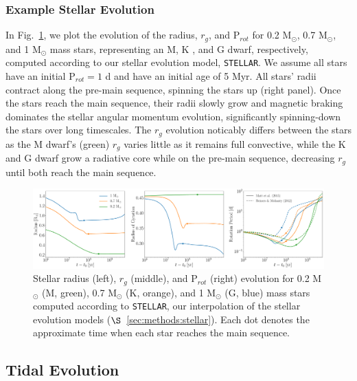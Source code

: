 \documentclass[twocolumn]{aastex61}
\newcommand{\stellar}[0]{\texttt{STELLAR}\xspace}
\begin{document}
\subsubsection{Example Stellar Evolution} \label{sec:methods:stellarExample}

In Fig.~\ref{fig:stellarExample}, we plot the evolution of the radius, $r_g$, and P$_{rot}$ for 0.2 M$_{\odot}$, 0.7 M$_{\odot}$, and 1 M$_{\odot}$ mass stars, representing an M, K , and G dwarf, respectively, computed according to our stellar evolution model, \stellar. We assume all stars have an initial P$_{rot} = 1$ d and have an initial age of 5 Myr. All stars' radii contract along the pre-main sequence, spinning the stars up (right panel). Once the stars reach the main sequence, their radii slowly grow and magnetic braking dominates the stellar angular momentum evolution, significantly spinning-down the stars over long timescales. The $r_g$ evolution noticably differs between the stars as the M dwarf's (green) $r_g$ varies little as it remains full convective, while the K and G dwarf grow a radiative core while on the pre-main sequence, decreasing $r_g$ until both reach the main sequence.

\begin{figure}[ht]
	\includegraphics[width=\textwidth]{../Plots/stellarExample.pdf}
   \caption{Stellar radius (left), $r_g$ (middle), and P$_{rot}$ (right) evolution for 0.2 M$_{\odot}$ (M, green), 0.7 M$_{\odot}$ (K, orange), and 1 M$_{\odot}$ (G, blue) mass stars computed according to \stellar, our interpolation of the \citet{Baraffe2015} stellar evolution models ($\S$~\ref{sec:methods:stellar}). Each dot denotes the approximate time when each star reaches the main sequence.}%
    \label{fig:stellarExample}%
\end{figure}

\subsection{Tidal Evolution} \label{sec:methods:eqtide}
\end{document}
